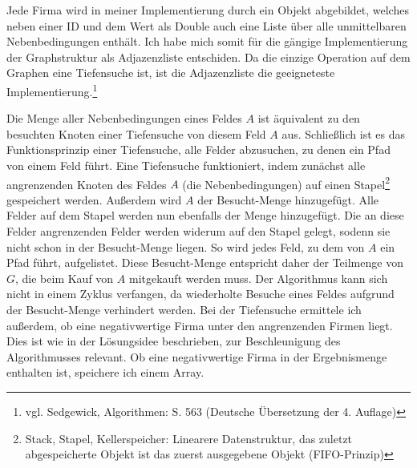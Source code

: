 Jede Firma wird in meiner Implementierung durch ein Objekt abgebildet, welches neben einer ID und dem Wert als Double auch eine Liste über alle unmittelbaren Nebenbedingungen enthält. Ich habe mich somit für die gängige Implementierung der Graphstruktur als Adjazenzliste entschiden. Da die einzige Operation auf dem Graphen eine Tiefensuche ist, ist die Adjazenzliste die geeigneteste Implementierung.\footnote{vgl. Sedgewick, Algorithmen: S. 563 (Deutsche Übersetzung der 4. Auflage)}

Die Menge aller Nebenbedingungen eines Feldes \(A\) ist äquivalent zu den besuchten Knoten einer Tiefensuche von diesem Feld \(A\) aus. Schließlich ist es das Funktionsprinzip einer Tiefensuche, alle Felder abzusuchen, zu denen ein Pfad von einem Feld führt. Eine Tiefensuche funktioniert, indem zunächst alle angrenzenden Knoten des Feldes \(A\) (die Nebenbedingungen) auf einen Stapel\footnote{Stack, Stapel, Kellerspeicher: Linearere Datenstruktur, das zuletzt abgespeicherte Objekt ist das zuerst ausgegebene Objekt (FIFO-Prinzip)} gespeichert werden.
Außerdem wird \(A\) der Besucht-Menge hinzugefügt. Alle Felder auf dem Stapel werden nun ebenfalls der Menge hinzugefügt. Die an diese Felder angrenzenden Felder werden widerum auf den Stapel gelegt, sodenn sie nicht schon in der Besucht-Menge liegen. So wird jedes Feld, zu dem von \(A\) ein Pfad führt, aufgelistet. Diese Besucht-Menge entspricht daher der Teilmenge von \(G\), die beim Kauf von \(A\) mitgekauft werden muss. Der Algorithmus kann sich nicht in einem Zyklus verfangen, da wiederholte Besuche eines Feldes aufgrund der Besucht-Menge verhindert werden.  Bei der Tiefensuche ermittele ich außerdem, ob eine negativwertige Firma unter den angrenzenden Firmen liegt. Dies ist wie in der Lösungsidee beschrieben, zur Beschleunigung des Algorithmusses relevant. Ob eine negativwertige Firma in der Ergebnismenge enthalten ist, speichere ich einem Array.

